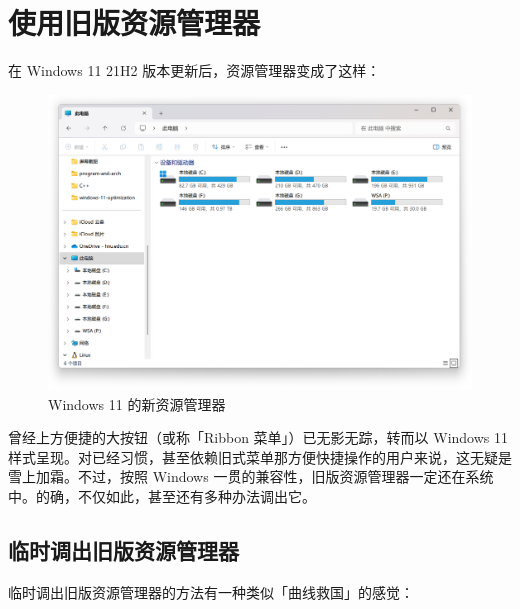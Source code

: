 \section{使用旧版资源管理器}

在 Windows 11 21H2 版本更新后，资源管理器变成了这样：

\begin{figure}[htb!]
  \centering
  \includegraphics[width=.65\textwidth]{assets/advanced/new-explorer.png}
  \caption{Windows 11 的新资源管理器}
  \label{fig:new-explorer}
\end{figure}

曾经上方便捷的大按钮（或称「Ribbon 菜单」）已无影无踪，转而以 Windows 11 样式呈现。对已经习惯，甚至依赖旧式菜单那方便快捷操作的用户来说，这无疑是雪上加霜。不过，按照 Windows 一贯的兼容性，旧版资源管理器一定还在系统中。的确，不仅如此，甚至还有多种办法调出它。

\subsection{临时调出旧版资源管理器}

临时调出旧版资源管理器的方法有一种类似「曲线救国」的感觉：

